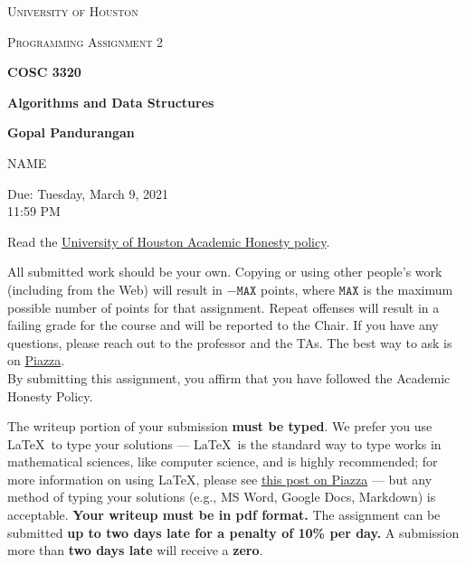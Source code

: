 \documentclass[final]{article}
\begin{document}
\begin{titlepage}
    \begin{center}
        {\scshape\LARGE University of Houston\par}
        \vspace{1cm}
        {\scshape\Large Programming Assignment 2 \par}
        \vspace{1.5cm}
        {\huge\bfseries COSC 3320 \par}
        {\huge\bfseries Algorithms and Data Structures \par}
        \vspace{0.5cm}
        {\large\bfseries Gopal Pandurangan\par}
        \vspace{2cm}
        {\Large NAME\par}
        \vspace{0.5cm}
        {\large \par} Due: Tuesday, March 9, 2021\\11:59 PM
    \end{center}


    Read the \href{https://www.uh.edu/provost/policies-resources/honesty/_documents-honesty/academic-honesty-policy.pdf}{University of Houston Academic Honesty policy}.

    \begin{tcolorbox}[title=Academic Honesty Policy,colback=red!15,colframe=red!65!black,fonttitle=\bfseries]All submitted work should be your own. Copying or using other people's work (including from the Web) will result in \(-\texttt{MAX}\) points, where \(\texttt{MAX}\) is the maximum possible number of points for that assignment. Repeat offenses will result in a failing grade for the course and will be reported to the Chair. If you have any questions, please reach out to the professor and the TAs. The best way to ask is on \href{https://piazza.com/uh/spring2021/cosc3320/home}{Piazza}.\\

        By submitting this assignment, you affirm that you have followed the Academic Honesty Policy.
    \end{tcolorbox}

    The writeup portion of your submission \textbf{must be typed}. We prefer you use \LaTeX~to type your solutions --- \LaTeX~is the standard way to type works in mathematical sciences, like computer science, and is highly recommended; for more information on using \LaTeX, please see \href{https://piazza.com/class/kjxhee6ctqe6cj?cid=8}{this post on Piazza} --- but any method of typing your solutions (e.g., MS Word, Google Docs, Markdown) is acceptable. \textbf{Your writeup must be in pdf format.} The assignment can be submitted \textbf{up to two days late for a penalty of 10\% per day.} A submission more than \textbf{two days late} will receive a \textbf{zero}.


\end{titlepage}
\end{document}
